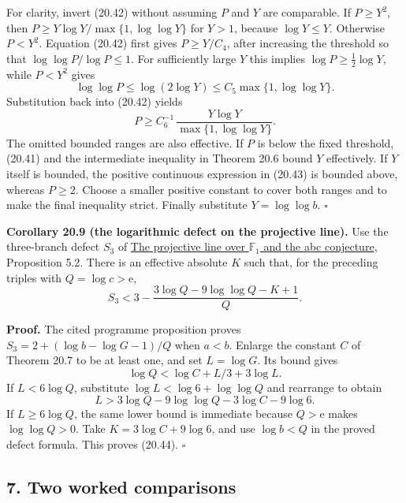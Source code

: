\documentclass[
  11pt,
  a4paper,
]{article}
\begin{document}
For clarity, invert (20.42) without assuming \(P\) and \(Y\) are
comparable. If \(P\ge Y^2\), then \(P\ge Y\log Y/\max\{1,\log\log Y\}\)
for \(Y>1\), because \(\log Y\le Y\). Otherwise \(P<Y^2\). Equation
(20.42) first gives \(P\ge Y/C_4\), after increasing the threshold so
that \(\log\log P/\log P\le1\). For sufficiently large \(Y\) this
implies \(\log P\ge\tfrac12\log Y\), while \(P<Y^2\) gives \[
 \log\log P\le\log(2\log Y)
 \le C_5\max\{1,\log\log Y\}.
 \] Substitution back into (20.42) yields \[
 P\ge C_6^{-1}\,
       \frac{Y\log Y}{\max\{1,\log\log Y\}}.
 \tag{20.43}
\] The omitted bounded ranges are also effective. If \(P\) is below the
fixed threshold, (20.41) and the intermediate inequality in Theorem 20.6
bound \(Y\) effectively. If \(Y\) itself is bounded, the positive
continuous expression in (20.43) is bounded above, whereas \(P\ge2\).
Choose a smaller positive constant to cover both ranges and to make the
final inequality strict. Finally substitute \(Y=\log\log b\).
\(\square\)

\textbf{Corollary 20.9 (the logarithmic defect on the projective line).}
Use the three-branch defect \(S_3\) of
\href{https://kokunoyumeto.github.io/open-math-courses-public/courses/the-field-with-one-element/the-projective-line-over-f-1-and-the-abc-conjecture.html\#section-5.1}{The
projective line over \(\mathbb F_1\) and the abc conjecture},
Proposition 5.2. There is an effective absolute \(K\) such that, for the
preceding triples with \(Q=\log c>\mathrm e\), \[
 S_3<
 3-\frac{3\log Q-9\log\log Q-K+1}{Q}.
 \tag{20.44}
\]

\textbf{Proof.} The cited programme proposition proves
\(S_3=2+(\log b-\log G-1)/Q\) when \(a<b\). Enlarge the constant \(C\)
of Theorem 20.7 to be at least one, and set \(L=\log G\). Its bound
gives \[
 \log Q<\log C+L/3+3\log L.
 \] If \(L<6\log Q\), substitute \(\log L<\log6+\log\log Q\) and
rearrange to obtain \[
 L>3\log Q-9\log\log Q-3\log C-9\log6.
 \tag{20.45}
\] If \(L\ge6\log Q\), the same lower bound is immediate because
\(Q>\mathrm e\) makes \(\log\log Q>0\). Take \(K=3\log C+9\log6\), and
use \(\log b<Q\) in the proved defect formula. This proves (20.44).
\(\square\)

\subsection{7. Two worked comparisons}\label{two-worked-comparisons}
\end{document}
